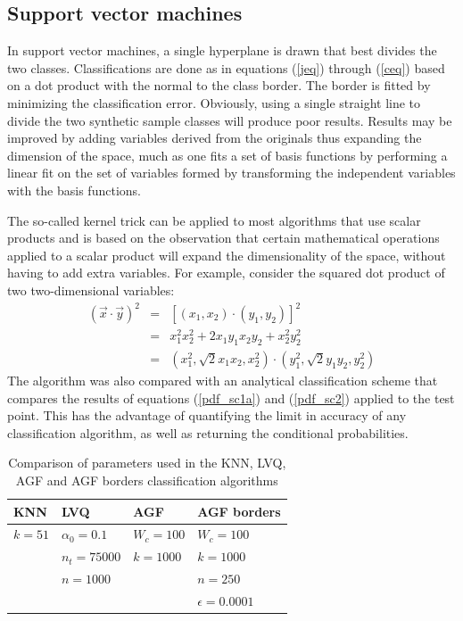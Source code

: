 \subsection{Support vector machines}

In support vector machines, a single hyperplane is drawn that best
divides the two classes.  Classifications are done as in equations
(\ref{jeq}) through (\ref{ceq}) based on a dot product with the normal
to the class border.  The border is fitted by minimizing the classification
error.  Obviously, using a single straight line to divide the two
synthetic sample classes will produce poor results. 
Results may be improved by 
adding variables derived from
the originals thus expanding the dimension of the space, 
much as one fits a set of basis functions by performing a linear
fit on the set of variables formed by transforming the independent variables
with the basis functions.

The so-called kernel trick can be applied to most algorithms
that use scalar products and is based on the observation that certain
mathematical operations applied to a scalar product will expand the
dimensionality of the space, without having to add extra variables.
For example, consider the squared dot product of two two-dimensional 
variables: \cite{Mueller_etal2001}
\begin{eqnarray}
(\vec x \cdot \vec y)^2 & = & [(x_1, x_2) \cdot (y_1, y_2)]^2 \\
& = & x_1^2 x_2^2 + 2 x_1 y_1 x_2 y_2 + x_2^2 y_2^2 \\
& = & (x_1^2, \sqrt{2} x_1 x_2, x_2^2) \cdot (y_1^2, \sqrt{2} y_1 y_2, y_2^2)
\end{eqnarray}
The algorithm was also compared with an analytical classification
scheme that compares the results of equations (\ref{pdf_sc1a}) and 
(\ref{pdf_sc2}) applied to the test point.  This has the advantage
of quantifying the limit in accuracy of any classification algorithm,
as well as returning the conditional probabilities.

\begin{table}
  \begin{center}
  \caption{Comparison of parameters used in the KNN, LVQ, AGF
	and AGF borders classification algorithms}
  \begin{tabular}[h]{|l|l|l|l|}\hline
    KNN & LVQ & AGF & AGF borders \\ \hline \hline
    $k = 51$ & $\alpha_0=0.1$ & $W_c = 100$ & $W_c=100$ \\
      & $n_t=75000$ & $k=1000$ & $k=1000$ \\
      & $n=1000$ & & $n=250$ \\ 
      & & & $\epsilon=0.0001$ \\ \hline
  \end{tabular}
  \label{parm_table}
  \end{center}
\end{table}

